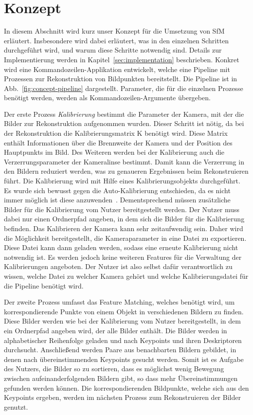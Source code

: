 
\chapter{Konzept}\label{sec:concept}
In diesem Abschnitt wird kurz unser Konzept für die Umsetzung von SfM erläutert. 
Insbesondere wird dabei erläutert, was in den einzelnen Schritten durchgeführt wird, und warum diese Schritte notwendig sind.
Details zur Implementierung werden in Kapitel~\ref{sec:implementation} beschrieben.
Konkret wird eine Kommandozeilen-Applikation entwickelt, welche eine Pipeline mit Prozessen zur Rekonstruktion von Bildpunkten bereitstellt.
Die Pipeline ist in Abb.~\ref{fig:concept-pipeline} dargestellt.
Parameter, die für die einzelnen Prozesse benötigt werden, werden als Kommandozeilen-Argumente übergeben.

Der erste Prozess \emph{Kalibrierung} bestimmt die Parameter der Kamera, mit der die Bilder zur Rekonstruktion aufgenommen wurden.
Dieser Schritt ist nötig, da bei der Rekonstruktion die Kalibrierungsmatrix K benötigt wird.
Diese Matrix enthält Informationen über die Brennweite der Kamera und der Position des Hauptpunkts im Bild.
Des Weiteren werden bei der Kalibrierung auch die Verzerrungsparameter der Kameralinse bestimmt.
Damit kann die Verzerrung in den Bildern reduziert werden, was zu genaueren Ergebnissen beim Rekonstruieren führt.
Die Kalibrierung wird mit Hilfe eines Kalibrierungsobjekts durchgeführt.
Es wurde sich bewusst gegen die Auto-Kalibrierung entschieden, da es nicht immer möglich ist diese anzuwenden~\cite{remondino_2005}.
Dementsprechend müssen zusätzliche Bilder für die Kalibrierung vom Nutzer bereitgestellt werden.
Der Nutzer muss dabei nur einen Ordnerpfad angeben, in dem sich die Bilder für die Kalibrierung befinden.
Das Kalibrieren der Kamera kann sehr zeitaufwendig sein.
Daher wird die Möglichkeit bereitgestellt, die Kameraparameter in eine Datei zu exportieren.
Diese Datei kann dann geladen werden, sodass eine erneute Kalibrierung nicht notwendig ist.
Es werden jedoch keine weiteren Features für die Verwaltung der Kalibrierungen angeboten.
Der Nutzer ist also selbst dafür verantwortlich zu wissen, welche Datei zu welcher Kamera gehört und welche Kalibrierungsdatei für die Pipeline benötigt wird. 

Der zweite Prozess umfasst das Feature Matching, welches benötigt wird, um korrespondierende Punkte von einem Objekt in verschiedenen Bildern zu finden.
Diese Bilder werden wie bei der Kalibrierung vom Nutzer bereitgestellt, in dem ein Ordnerpfad angeben wird, der alle Bilder enthält. 
Die Bilder werden in alphabetischer Reihenfolge geladen und nach Keypoints und ihren Deskriptoren durchsucht.
Anschließend werden Paare aus benachbarten Bildern gebildet, in denen nach übereinstimmenden Keypoints gesucht werden.
Somit ist es Aufgabe des Nutzers, die Bilder so zu sortieren, dass es möglichst wenig Bewegung zwischen aufeinanderfolgenden Bildern gibt, so dass mehr Übereinstimmungen gefunden werden können.
Die korrespondierenden Bildpunkte, welche sich aus den Keypoints ergeben, werden im nächsten Prozess zum Rekonstruieren der Bilder genutzt.

